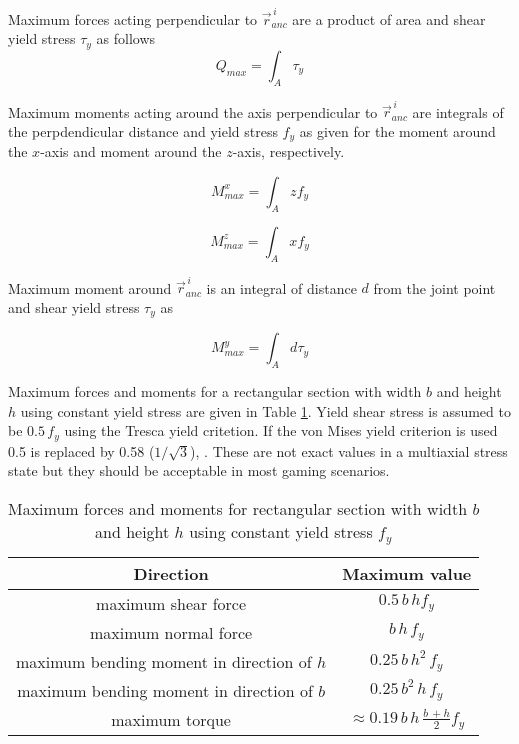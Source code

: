 Maximum forces acting perpendicular to $\vec{r}_{anc}^{\,i} $
are a product of area and shear yield stress $\tau_y$ as follows
\begin{equation} \label{eq:fQ}
Q_{max}= \int_A \tau_y
\end{equation}

Maximum moments acting around the axis perpendicular to $\vec{r}_{anc}^{\,i} $
are integrals of the perpdendicular distance 
and yield stress $f_y$ as given for the moment around the $x$-axis 
and moment around the $z$-axis, respectively.

\begin{equation} \label{eq:Mx}
M_{max}^x= \int_A z f_y
\end{equation}

\begin{equation} \label{eq:Mz}
M_{max}^z= \int_A x f_y
\end{equation}

Maximum moment around $\vec{r}_{anc}^{\,i} $
is an integral of distance $d$ from the joint point
and shear yield stress $\tau_y$ as 

\begin{equation} \label{eq:My}
M_{max}^y= \int_A d \tau_y
\end{equation}

Maximum forces and moments for a
rectangular section with width $b$ and height $h$ using constant yield stress
are given in Table \ref{tab:maxForces}.
Yield shear stress is assumed to be $ 0.5\, f_y$ using the Tresca yield critetion.
If the von Mises yield criterion is used 0.5 is replaced by 0.58 ($1/\sqrt{3}$), \cite{dowling}.
These are not exact values in a multiaxial stress state but they
should be acceptable in most gaming scenarios.

\begin {table}[htb!]
\caption {Maximum forces and moments for 
rectangular section with width $b$ and height $h$ using constant yield stress $f_y$}
\label{tab:maxForces} 
\begin{center}
\begin{tabular}{| c| c|}
\hline
{\bf Direction} & {\bf Maximum value}  \\ \hline
maximum shear force & $0.5\, b\, h f_y$ \\ \hline
maximum normal force & $b\, h\, f_y$  \\ \hline
maximum bending moment in direction of $h$& $0.25\, b\, h^2 \, f_y$  \\ \hline
maximum bending moment in direction of $b$ & $0.25\, b^2\, h\, f_y$  \\ \hline
maximum torque & $ \approx 0.19\, b\, h\, \frac{b\, + h}{2} f_y$  \\ \hline
\end{tabular}
\end{center}
\end {table}

